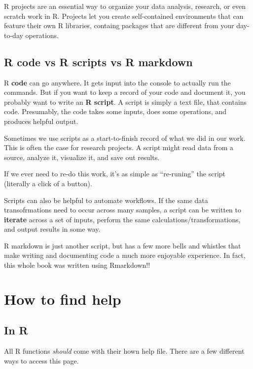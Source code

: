 \documentclass[
]{book}
\begin{document}
R projects are an essential way to organize your data analysis, research, or even scratch work in R. Projects let you create self-contained environments that can feature their own R libraries, containg packages that are different from your day-to-day operations.

\hypertarget{r-code-vs-r-scripts-vs-r-markdown}{%
\subsection{R code vs R scripts vs R markdown}\label{r-code-vs-r-scripts-vs-r-markdown}}

R \textbf{code} can go anywhere. It gets input into the console to actually run the commands. But if you want to keep a record of your code and document it, you probably want to write an \textbf{R script}. A script is simply a text file, that contains code. Presumably, the code takes some inputs, does some operations, and produces helpful output.

Sometimes we use scripts as a start-to-finish record of what we did in our work. This is often the case for research projects. A script might read data from a source, analyze it, visualize it, and save out results.

If we ever need to re-do this work, it's as simple as ``re-runing'' the script (literally a click of a button).

Scripts can also be helpful to automate workflows. If the same data transofrmations need to occur across many samples, a script can be written to \textbf{iterate} across a set of inputs, perform the same calculations/transformations, and output results in some way.

R markdown is just another script, but has a few more bells and whistles that make writing and documenting code a much more enjoyable experience. In fact, this whole book was written using Rmarkdown!!

\hypertarget{how-to-find-help}{%
\section*{How to find help}\label{how-to-find-help}}

\hypertarget{in-r}{%
\subsection{In R}\label{in-r}}

All R functions \emph{should} come with their hown help file. There are a few different ways to access this page.
\end{document}
